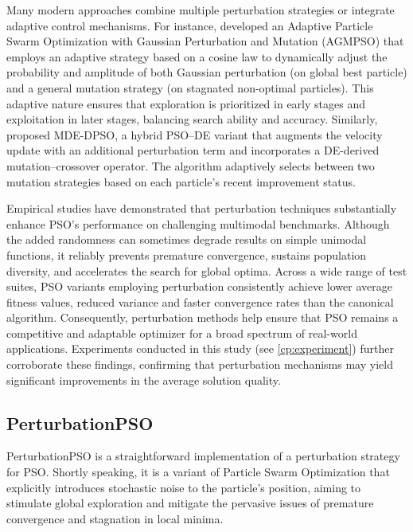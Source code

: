 {Many modern approaches combine multiple perturbation strategies or integrate adaptive control mechanisms. For instance, \citet{chen2021adaptive} developed an Adaptive Particle Swarm Optimization with Gaussian Perturbation and Mutation (AGMPSO) that employs an adaptive strategy based on a cosine law to dynamically adjust the probability and amplitude of both Gaussian perturbation (on global best particle) and a general mutation strategy (on stagnated non-optimal particles). This adaptive nature ensures that exploration is prioritized in early stages and exploitation in later stages, balancing search ability and accuracy.
Similarly, \citet{xu2025hybrid} proposed MDE-DPSO, a hybrid PSO–DE variant that augments the velocity update with an additional perturbation term and incorporates a DE-derived mutation–crossover operator. The algorithm adaptively selects between two mutation strategies based on each particle’s recent improvement status.

Empirical studies have demonstrated that perturbation techniques substantially enhance PSO’s performance on challenging multimodal benchmarks. Although the added randomness can sometimes degrade results on simple unimodal functions, it reliably prevents premature convergence, sustains population diversity, and accelerates the search for global optima. Across a wide range of test suites, PSO variants employing perturbation consistently achieve lower average fitness values, reduced variance and faster convergence rates than the canonical algorithm. Consequently, perturbation methods help ensure that PSO remains a competitive and adaptable optimizer for a broad spectrum of real-world applications. Experiments conducted in this study  (see \autoref{cp:experiment}) further corroborate these findings, confirming that perturbation mechanisms may yield significant improvements in the average solution quality.


\subsection{PerturbationPSO}

PerturbationPSO is a straightforward implementation of a perturbation strategy for PSO. Shortly speaking, it is a variant of Particle Swarm Optimization that explicitly introduces stochastic noise to the particle's position, aiming to stimulate global exploration and mitigate the pervasive issues of premature convergence and stagnation in local minima.

}
